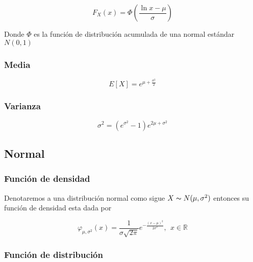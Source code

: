 \documentclass{article}
\begin{document}
                    \begin{equation*}
                        F_X(x) = \Phi \left( \frac{\ln x -\mu}{\sigma} \right)
                    \end{equation*}

                Donde $\Phi$ es la función de distribución acumulada de una normal estándar $N(0,1)$

            \subsubsection{Media}

                \begin{equation*}
                    E[X] = e^{\mu + \frac{\sigma ^2}{2}}
                \end{equation*}
                
            \subsubsection{Varianza}

                \begin{equation*}
                    \sigma ^2 = \left( e^{\sigma ^2} -1\right) e^{2\mu +\sigma ^2}
                \end{equation*}

        \subsection{Normal}

            \subsubsection{Función de densidad}

                Denotaremos a una distribución normal como sigue $X\thicksim N (\mu, \sigma ^2)$ entonces su función de densidad esta dada por
    
                    \begin{equation*}
                        \varphi_{\mu, \sigma ^2} (x) = \frac{1}{\sigma \sqrt{2\pi}} e^{-\frac{(x-\mu)^2}{2\sigma ^2}}, ~~x \in \mathbb{R}
                    \end{equation*}

            \subsubsection{Función de distribución}
\end{document}
